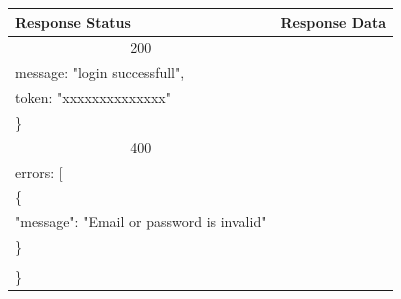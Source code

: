 \documentclass[12pt,oneside,openright,a4paper]{cpe-thai-project}
\begin{document}
\begin{itemize}
\begin{longtable}[!ht]{p{3cm}|p{8cm}}
  \textbf{Response Status}  & \multicolumn{1}{c}{\textbf{Response Data}}                                                                          \\ \hline
  \multicolumn{1}{c|}{200}  & \begin{tabular}[c]{@{}l@{}}\{\\ \quad message: "login successfull",\\ \quad token: "xxxxxxxxxxxxxx" \\\}\end{tabular}                                 \\ \hline
  \multicolumn{1}{c|}{400}  &
  \begin{tabular}[c]{@{}l@{}}\{\\ \quad errors: {[}\\ \quad\quad\{\\ \quad\quad\quad "message": "Email or password is invalid"\\ \quad\quad \}\\ \quad{]}\\\}\end{tabular}                                                                      \\ \hline
  \hline
\end{longtable}


\end{itemize}
\end{document}
